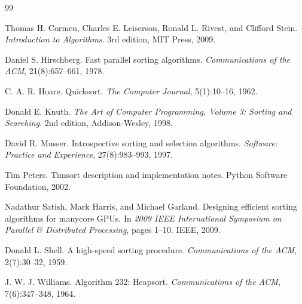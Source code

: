 \documentclass[11pt,a4paper]{article}
\begin{document}
\begin{thebibliography}{99}

Thomas H. Cormen, Charles E. Leiserson, Ronald L. Rivest, and Clifford Stein.
\newblock \emph{Introduction to Algorithms}.
\newblock 3rd edition, MIT Press, 2009.

Daniel S. Hirschberg.
\newblock Fast parallel sorting algorithms.
\newblock \emph{Communications of the ACM}, 21(8):657--661, 1978.

C. A. R. Hoare.
\newblock Quicksort.
\newblock \emph{The Computer Journal}, 5(1):10--16, 1962.

Donald E. Knuth.
\newblock \emph{The Art of Computer Programming, Volume 3: Sorting and Searching}.
\newblock 2nd edition, Addison-Wesley, 1998.

David R. Musser.
\newblock Introspective sorting and selection algorithms.
\newblock \emph{Software: Practice and Experience}, 27(8):983--993, 1997.

Tim Peters.
\newblock Timsort description and implementation notes.
\newblock Python Software Foundation, 2002.

Nadathur Satish, Mark Harris, and Michael Garland.
\newblock Designing efficient sorting algorithms for manycore GPUs.
\newblock In \emph{2009 IEEE International Symposium on Parallel \& Distributed Processing}, pages 1--10. IEEE, 2009.

Donald L. Shell.
\newblock A high-speed sorting procedure.
\newblock \emph{Communications of the ACM}, 2(7):30--32, 1959.

J. W. J. Williams.
\newblock Algorithm 232: Heapsort.
\newblock \emph{Communications of the ACM}, 7(6):347--348, 1964.

\end{thebibliography}
\end{document}
